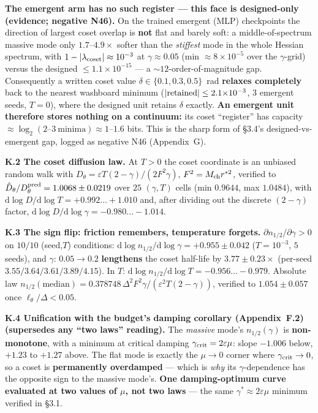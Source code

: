 \documentclass[10pt]{article}
\begin{document}
\textbf{The emergent arm has no such register --- this face is designed-only (evidence; negative N46).} On the trained emergent (MLP) checkpoints the direction of largest coset overlap is \textbf{not} flat and barely soft: a middle-of-spectrum massive mode only $1.7$--$4.9\times$ softer than the \emph{stiffest} mode in the whole Hessian spectrum, with $1-|\lambda_{\rm coset}|\approx10^{-3}$ at $\gamma\approx0.05$ (min $\approx8{\times}10^{-5}$ over the $\gamma$-grid) versus the designed $\le1.1{\times}10^{-15}$ --- a $\sim\!12$-order-of-magnitude gap. Consequently a written coset value $\delta\in\{0.1,0.3,0.5\}$~rad \textbf{relaxes completely} back to the nearest washboard minimum ($|{\rm retained}|\le2.1{\times}10^{-3}$, $3$ emergent seeds, $T=0$), where the designed unit retains $\delta$ exactly. \textbf{An emergent unit therefore stores nothing on a continuum:} its coset ``register'' has capacity $\approx\log_2(2\text{--}3\ \text{minima})\approx1$--$1.6$ bits. This is the sharp form of \S3.4's designed-vs-emergent gap, logged as negative N46 (Appendix~G).

\textbf{K.2 The coset diffusion law.} At $T>0$ the coset coordinate is an unbiased random walk with $D_\theta=\varepsilon T(2-\gamma)/(2F^2\gamma)$, $F^2=M_{\rm ch}r^{*2}$, verified to $\hat D_\theta/D_\theta^{\rm pred}=1.0068\pm0.0219$ over $25$ $(\gamma,T)$ cells (min $0.9644$, max $1.0484$), with $\mathrm{d}\log D/\mathrm{d}\log T=+0.992\ldots+1.010$ and, after dividing out the discrete $(2-\gamma)$ factor, $\mathrm{d}\log D/\mathrm{d}\log\gamma=-0.980\ldots-1.014$.

\textbf{K.3 The sign flip: friction remembers, temperature forgets.} $\partial n_{1/2}/\partial\gamma>0$ on $10/10$ (seed,$T$) conditions: $\mathrm{d}\log n_{1/2}/\mathrm{d}\log\gamma=+0.955\pm0.042$ ($T{=}10^{-3}$, $5$ seeds), and $\gamma{:}\,0.05\to0.2$ \textbf{lengthens} the coset half-life by $3.77\pm0.23\times$ (per-seed $3.55/3.64/3.61/3.89/4.15$). In $T$: $\mathrm{d}\log n_{1/2}/\mathrm{d}\log T=-0.956\ldots-0.979$. Absolute law $n_{1/2}(\text{median})=0.378748\,\Delta^2F^2\gamma/(\varepsilon^2T(2-\gamma))$, verified to $1.054\pm0.057$ once $\ell_\theta/\Delta<0.05$.

\textbf{K.4 Unification with the budget's damping corollary (Appendix~F.2) (supersedes any ``two laws'' reading).} The \emph{massive} mode's $n_{1/2}(\gamma)$ is \textbf{non-monotone}, with a minimum at critical damping $\gamma_{\rm crit}=2\varepsilon\mu$: slope $-1.006$ below, $+1.23$ to $+1.27$ above. The flat mode is exactly the $\mu\to0$ corner where $\gamma_{\rm crit}\to0$, so a coset is \textbf{permanently overdamped} --- which is \emph{why} its $\gamma$-dependence has the opposite sign to the massive mode's. \textbf{One damping-optimum curve evaluated at two values of $\mu$, not two laws} --- the same $\gamma^*\approx2\varepsilon\mu$ minimum verified in \S3.1.
\end{document}
